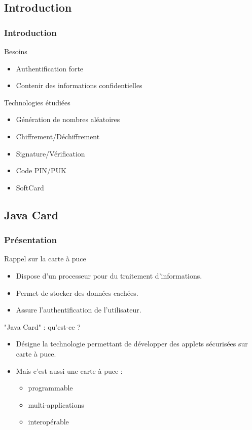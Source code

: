 \documentclass{beamer}
\begin{document}
\subsection{Introduction}
\begin{frame}
\frametitle{Introduction}
\begin{block}{Besoins}
\begin{itemize}
\item Authentification forte
\item Contenir des informations confidentielles
\end{itemize}
\end{block}

\begin{exampleblock}{Technologies étudiées}
\begin{itemize}
\item Génération de nombres aléatoires
\item Chiffrement/Déchiffrement
\item Signature/Vérification
\item Code PIN/PUK
\item SoftCard
\end{itemize}
\end{exampleblock}

\end{frame}

\subsection{Java Card}
\begin{frame}
    \frametitle{Présentation}
    \begin{block}{Rappel sur la carte à puce}
        \begin{itemize}
            \item Dispose d'un processeur pour du traitement d'informations.
            \item Permet de stocker des données cachées.
            \item Assure l'authentification de l'utilisateur.
        \end{itemize}
    \end{block}
    \begin{block}{"Java Card" : qu'est-ce ?}
        \begin{itemize}
            \item Désigne la technologie permettant de développer
                des applets \og sécurisées \fg{} sur carte à puce.

            \item Mais c'est aussi une carte à puce : 
                \begin{itemize}
                    \item programmable 
                    \item multi-applications
                    \item interopérable
                \end{itemize}
        \end{itemize}
    \end{block}
\end{frame}
\end{document}
